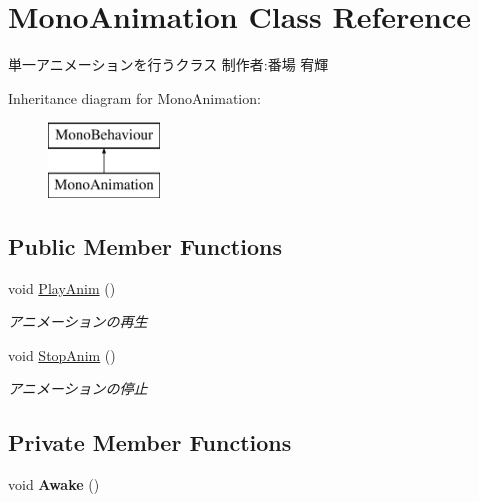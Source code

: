 \hypertarget{class_mono_animation}{}\section{Mono\+Animation Class Reference}
\label{class_mono_animation}


単一アニメーションを行うクラス 制作者\+:番場 宥輝  


Inheritance diagram for Mono\+Animation\+:\begin{figure}[H]
\begin{center}
\leavevmode
\includegraphics[height=2.000000cm]{class_mono_animation}
\end{center}
\end{figure}
\subsection*{Public Member Functions}
\begin{DoxyCompactItemize}
\item 
void \hyperlink{class_mono_animation_a89ea28da9b3ba3fd9a147c778989009c}{Play\+Anim} ()
\begin{DoxyCompactList}\small\item\em アニメーションの再生 \end{DoxyCompactList}\item 
void \hyperlink{class_mono_animation_ad1f8c94c63be3057dcd516979d6e8985}{Stop\+Anim} ()
\begin{DoxyCompactList}\small\item\em アニメーションの停止 \end{DoxyCompactList}\end{DoxyCompactItemize}
\subsection*{Private Member Functions}
\begin{DoxyCompactItemize}
\item 
\mbox{\label{class_mono_animation_a6027158c284bc8f28b441ef92912b566}} 
void {\bfseries Awake} ()
\end{DoxyCompactItemize}
